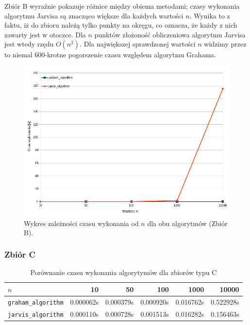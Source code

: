 \documentclass[11pt,a4paper]{article}
\begin{document}
Zbiór B wyraźnie pokazuje różnice między obiema metodami; czasy
wykonania algorytmu Jarvisa są znacząco większe dla każdych wartości $n$. 
Wynika to z faktu, iż do zbioru należą tylko punkty na okręgu, 
co oznacza, że każdy z nich zawarty jest w otoczce. Dla $n$ punktów 
złożoność obliczeniowa algorytmu Jarvisa jest wtedy rzędu $O(n^2)$.
Dla największej sprawdzonej wartości $n$ widzimy przez to niemal 600-krotne
pogorszenie czasu względem algorytmu Grahama.

\begin{figure}[H]
    \centering
    \includegraphics[scale=0.6]{res/wykres_b.png}
    \caption{Wykres zależności czasu wykonania 
    od $n$ dla obu algorytmów (Zbiór B).}
\end{figure}

\subsubsection{Zbiór C}
\begin{table}[H]
    \centering
    \begin{tabular}{|l|r|r|r|r|r|}
    \hline
        $n$ & 10 & 50 & 100 & 1000 & 10000 \\ \hline
        \verb|graham_algorithm| & 0.000062s & 0.000379s & 0.000920s & 0.016762s & 0.522928s \\ \hline
        \verb|jarvis_algorithm| & 0.000110s & 0.000728s & 0.001513s & 0.016282s & 0.156463s \\ \hline
    \end{tabular}
    \caption{Porównanie czasu wykonania algorytymów dla zbiorów typu C}
\end{table}
\end{document}
